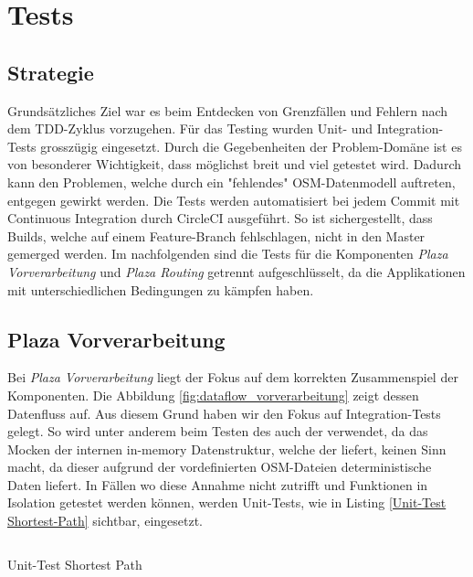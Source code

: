 
\section{Tests}
\label{sec:Tests}

\subsection{Strategie}
\label{test:Strategie}
Grundsätzliches Ziel war es beim Entdecken von Grenzfällen und Fehlern nach dem \ac{TDD}-Zyklus vorzugehen. Für das Testing wurden Unit- und Integration-Tests grosszügig eingesetzt. Durch die Gegebenheiten der Problem-Domäne ist es von besonderer Wichtigkeit, dass möglichst breit und viel getestet wird. Dadurch kann den Problemen, welche durch ein "fehlendes" \ac{OSM}-Datenmodell auftreten, entgegen gewirkt werden.  Die Tests werden automatisiert bei jedem Commit mit Continuous Integration durch CircleCI \cite{circleci} ausgeführt. So ist sichergestellt, dass Builds, welche auf einem Feature-Branch fehlschlagen, nicht in den Master gemerged werden. Im nachfolgenden sind die Tests für die Komponenten \emph{Plaza Vorverarbeitung} und \emph{Plaza Routing} getrennt aufgeschlüsselt, da die Applikationen mit unterschiedlichen Bedingungen zu kämpfen haben.


\subsection{Plaza Vorverarbeitung}
\label{test:Plaza Vorverarbeitung}
Bei \emph{Plaza Vorverarbeitung} liegt der Fokus auf dem korrekten Zusammenspiel der Komponenten. Die Abbildung \ref{fig:dataflow_vorverarbeitung} zeigt dessen Datenfluss auf. Aus diesem Grund haben wir den Fokus auf Integration-Tests gelegt. So wird unter anderem beim Testen des  auch der  verwendet, da das Mocken der internen in-memory Datenstruktur, welche der  liefert, keinen Sinn macht, da dieser aufgrund der vordefinierten \ac{OSM}-Dateien deterministische Daten liefert. In Fällen wo diese Annahme nicht zutrifft und Funktionen in Isolation getestet werden können, werden Unit-Tests, wie in Listing \ref{Unit-Test Shortest-Path} sichtbar, eingesetzt.

\begin{listing}[ht]
    \inputminted{python}{projectdoc/listing/test_compute_dijkstra_shortest_paths.py}
    \caption{Unit-Test Shortest Path}
    \label{Unit-Test Shortest-Path}
\end{listing}

